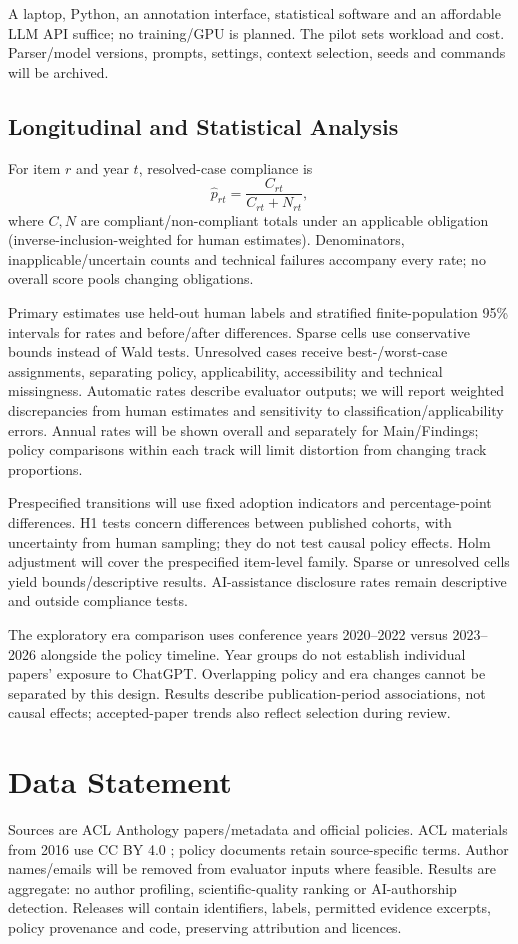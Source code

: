\documentclass[11pt]{article}
\begin{document}
A laptop, Python, an annotation interface, statistical software and an affordable LLM API suffice; no training/GPU is planned. The pilot sets workload and cost. Parser/model versions, prompts, settings, context selection, seeds and commands will be archived.

\subsection{Longitudinal and Statistical Analysis}
For item $r$ and year $t$, resolved-case compliance is
\[
\widehat{p}_{rt}=\frac{C_{rt}}{C_{rt}+N_{rt}},
\]
where $C,N$ are compliant/non-compliant totals under an applicable obligation (inverse-inclusion-weighted for human estimates). Denominators, inapplicable/uncertain counts and technical failures accompany every rate; no overall score pools changing obligations.

Primary estimates use held-out human labels and stratified finite-population 95\% intervals for rates and before/after differences. Sparse cells use conservative bounds instead of Wald tests. Unresolved cases receive best-/worst-case assignments, separating policy, applicability, accessibility and technical missingness. Automatic rates describe evaluator outputs; we will report weighted discrepancies from human estimates and sensitivity to classification/applicability errors. Annual rates will be shown overall and separately for Main/Findings; policy comparisons within each track will limit distortion from changing track proportions.

Prespecified transitions will use fixed adoption indicators and percentage-point differences. H1 tests concern differences between published cohorts, with uncertainty from human sampling; they do not test causal policy effects. Holm adjustment will cover the prespecified item-level family. Sparse or unresolved cells yield bounds/descriptive results. AI-assistance disclosure rates remain descriptive and outside compliance tests.

The exploratory era comparison uses conference years 2020--2022 versus 2023--2026 alongside the policy timeline. Year groups do not establish individual papers' exposure to ChatGPT. Overlapping policy and era changes cannot be separated by this design. Results describe publication-period associations, not causal effects; accepted-paper trends also reflect selection during review.

\section{Data Statement}
Sources are ACL Anthology papers/metadata and official policies. ACL materials from 2016 use CC BY 4.0 \cite{anthologycopyright}; policy documents retain source-specific terms. Author names/emails will be removed from evaluator inputs where feasible. Results are aggregate: no author profiling, scientific-quality ranking or AI-authorship detection. Releases will contain identifiers, labels, permitted evidence excerpts, policy provenance and code, preserving attribution and licences.
\end{document}
